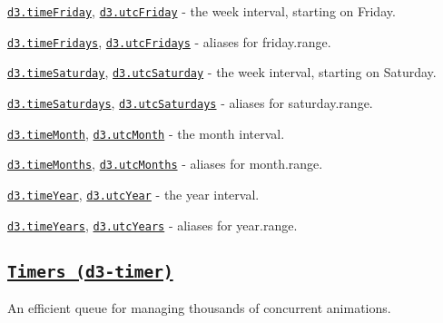 \begin{DoxyItemize}
\item \href{https://github.com/d3/d3-time/blob/master/README.md#timeFriday}{\tt d3.\+time\+Friday}, \href{https://github.com/d3/d3-time/blob/master/README.md#timeFriday}{\tt d3.\+utc\+Friday} -\/ the week interval, starting on Friday.
\item \href{https://github.com/d3/d3-time/blob/master/README.md#timeFriday}{\tt d3.\+time\+Fridays}, \href{https://github.com/d3/d3-time/blob/master/README.md#timeFriday}{\tt d3.\+utc\+Fridays} -\/ aliases for friday.\+range.
\item \href{https://github.com/d3/d3-time/blob/master/README.md#timeSaturday}{\tt d3.\+time\+Saturday}, \href{https://github.com/d3/d3-time/blob/master/README.md#timeSaturday}{\tt d3.\+utc\+Saturday} -\/ the week interval, starting on Saturday.
\item \href{https://github.com/d3/d3-time/blob/master/README.md#timeSaturday}{\tt d3.\+time\+Saturdays}, \href{https://github.com/d3/d3-time/blob/master/README.md#timeSaturday}{\tt d3.\+utc\+Saturdays} -\/ aliases for saturday.\+range.
\item \href{https://github.com/d3/d3-time/blob/master/README.md#timeMonth}{\tt d3.\+time\+Month}, \href{https://github.com/d3/d3-time/blob/master/README.md#timeMonth}{\tt d3.\+utc\+Month} -\/ the month interval.
\item \href{https://github.com/d3/d3-time/blob/master/README.md#timeMonth}{\tt d3.\+time\+Months}, \href{https://github.com/d3/d3-time/blob/master/README.md#timeMonth}{\tt d3.\+utc\+Months} -\/ aliases for month.\+range.
\item \href{https://github.com/d3/d3-time/blob/master/README.md#timeYear}{\tt d3.\+time\+Year}, \href{https://github.com/d3/d3-time/blob/master/README.md#timeYear}{\tt d3.\+utc\+Year} -\/ the year interval.
\item \href{https://github.com/d3/d3-time/blob/master/README.md#timeYear}{\tt d3.\+time\+Years}, \href{https://github.com/d3/d3-time/blob/master/README.md#timeYear}{\tt d3.\+utc\+Years} -\/ aliases for year.\+range.
\end{DoxyItemize}

\subsection*{\href{https://github.com/d3/d3-timer}{\tt Timers (d3-\/timer)}}

An efficient queue for managing thousands of concurrent animations.


